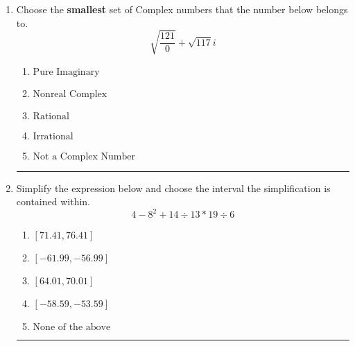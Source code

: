 \documentclass[14pt]{extbook}
\newcommand{\litem}[1]{\item#1\hspace*{-1cm}\rule{\textwidth}{0.4pt}}
\begin{document}
\begin{enumerate}
{\begin{enumerate}[label=\Alph*.]
\end{enumerate} }
\litem{
Choose the \textbf{smallest} set of Complex numbers that the number below belongs to.\[ \sqrt{\frac{121}{0}}+\sqrt{117} i \]\begin{enumerate}[label=\Alph*.]
\item \( \text{Pure Imaginary} \)
\item \( \text{Nonreal Complex} \)
\item \( \text{Rational} \)
\item \( \text{Irrational} \)
\item \( \text{Not a Complex Number} \)

\end{enumerate} }
\litem{
Simplify the expression below and choose the interval the simplification is contained within.\[ 4 - 8^2 + 14 \div 13 * 19 \div 6 \]\begin{enumerate}[label=\Alph*.]
\item \( [71.41, 76.41] \)
\item \( [-61.99, -56.99] \)
\item \( [64.01, 70.01] \)
\item \( [-58.59, -53.59] \)
\item \( \text{None of the above} \)

\end{enumerate} }
\end{enumerate}
\end{document}
